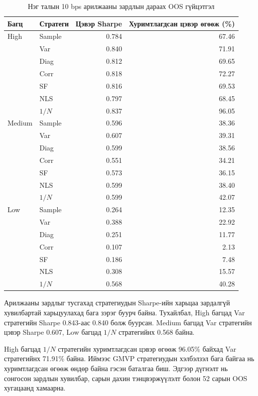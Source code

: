 \begin{table}[htbp]
	\centering
	\caption{Нэг талын 10 bps арилжааны зардлын дараах OOS гүйцэтгэл}
	\label{tab:trading_cost_results}
	\small
	\begin{tabular}{llrr}
		\hline
		Багц & Стратеги &
		Цэвэр Sharpe &
		Хуримтлагдсан цэвэр өгөөж (\%) \\
		\hline
		High & Sample & 0.784 & 67.46 \\
		& Var & 0.840 & 71.91 \\
		& Diag & 0.812 & 69.65 \\
		& Corr & 0.818 & 72.27 \\
		& SF & 0.816 & 69.53 \\
		& NLS & 0.797 & 68.45 \\
		& $1/N$ & 0.837 & 96.05 \\
		\hline
		Medium & Sample & 0.596 & 38.36 \\
		& Var & 0.607 & 39.31 \\
		& Diag & 0.599 & 38.56 \\
		& Corr & 0.551 & 34.21 \\
		& SF & 0.573 & 36.15 \\
		& NLS & 0.599 & 38.40 \\
		& $1/N$ & 0.599 & 42.07 \\
		\hline
		Low & Sample & 0.264 & 12.35 \\
		& Var & 0.388 & 22.92 \\
		& Diag & 0.251 & 11.77 \\
		& Corr & 0.107 & 2.13 \\
		& SF & 0.186 & 7.48 \\
		& NLS & 0.308 & 15.57 \\
		& $1/N$ & 0.568 & 40.28 \\
		\hline
	\end{tabular}
\end{table}

Арилжааны зардлыг тусгахад стратегиудын
Sharpe-ийн харьцаа зардалгүй
хувилбартай харьцуулахад бага зэрэг
буурч байна. Тухайлбал, High багцад
Var стратегийн Sharpe 0.843-аас
0.840 болж буурсан. Medium багцад
Var стратегийн цэвэр Sharpe 0.607,
Low багцад $1/N$ стратегийнх 0.568 байна.

High багцад $1/N$ стратегийн
хуримтлагдсан цэвэр өгөөж 96.05\%
байхад Var стратегийнх 71.91\% байна.
Иймээс GMVP стратегиудын хэлбэлзэл
бага байгаа нь хуримтлагдсан өгөөж
өндөр байна гэсэн баталгаа биш.
Эдгээр дүгнэлт нь сонгосон зардлын
хувилбар, сарын дахин тэнцвэржүүлэлт
болон 52 сарын OOS хугацаанд хамаарна.

